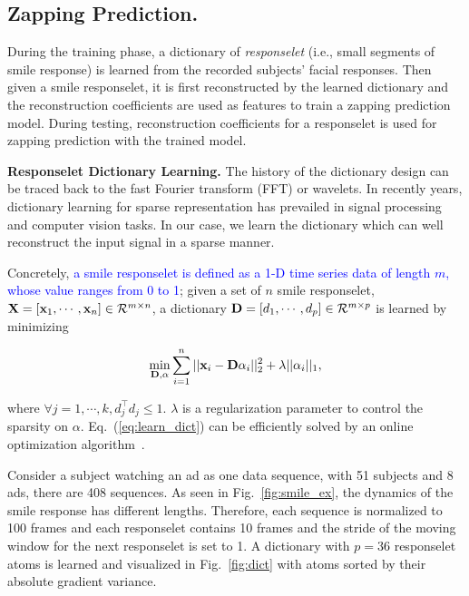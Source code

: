 \documentclass[twoside,leqno,twocolumn]{article}
\newcommand{\SFAdd}[1]{\textcolor{blue}{#1}}
\begin{document}
\subsection{Zapping Prediction.}

During the training phase, a dictionary of \textit{responselet} (i.e., small segments of smile response) is learned from the recorded subjects' facial responses. Then given a smile responselet, it is first reconstructed by the learned dictionary and the reconstruction coefficients are used as features to train a zapping prediction model. During testing, reconstruction coefficients for a responselet is used for zapping prediction with the trained model. 

\noindent \textbf{Responselet Dictionary Learning.} The history of the dictionary design can be traced back to the fast Fourier transform (FFT) or wavelets. In recently years, dictionary learning for sparse representation has prevailed in signal processing and computer vision tasks. In our case, we learn the dictionary which can well reconstruct the input signal in a sparse manner. 

Concretely, \SFAdd{a smile responselet is defined as a 1-D time series data of length $m$, whose value ranges from 0 to 1}; given a set of $n$ smile responselet, ${\bf X}=[{\bf x}_1, \cdots, {\bf x}_n]\in \mathcal{R}^{m\times n}$, a dictionary ${\bf D}=[d_1,\cdots,d_p] \in \mathcal{R}^{m\times p}$ is learned by minimizing

\begin{align}
\label{eq:learn_dict}
\min_{{\bf D} , \alpha} \sum_{i=1}^n ||{\bf x}_i-{\bf D}\alpha_i||^2_2 +\lambda ||\alpha_i||_1,
\end{align}

\noindent where $\forall j=1,\cdots,k, d^\top_j d_j \leq 1$. $\lambda$ is a regularization parameter to control the sparsity on $\alpha$. Eq.~(\ref{eq:learn_dict}) can be efficiently solved by an online optimization algorithm~\cite{spams}. 

Consider a subject watching an ad as one data sequence, with 51 subjects and 8 ads, there are 408 sequences. As seen in Fig.~\ref{fig:smile_ex}, the dynamics of the smile response has different lengths. Therefore, each sequence is normalized to 100 frames and each responselet contains 10 frames and the stride of the moving window for the next responselet is set to 1. A dictionary with $p=36$ responselet atoms is learned and visualized in Fig.~\ref{fig:dict} with atoms sorted by their absolute gradient variance. 
\end{document}
